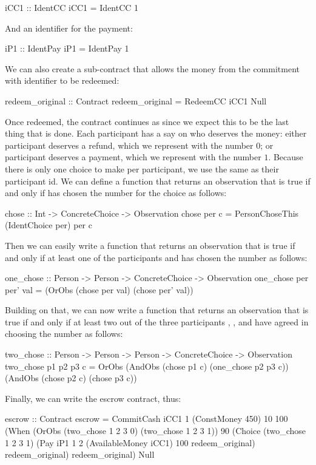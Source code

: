 \documentclass[runningheads]{llncs}
\begin{document}
\begin{haskellcode}
iCC1 :: IdentCC
iCC1 = IdentCC 1
\end{haskellcode}
And an identifier for the payment:
\begin{haskellcode}
iP1 :: IdentPay
iP1 = IdentPay 1
\end{haskellcode}
We can also create a sub-contract that allows the money from the commitment with identifier  to 
be redeemed:
\begin{haskellcode}
redeem_original :: Contract
redeem_original = RedeemCC iCC1 Null
\end{haskellcode}
Once redeemed, the contract continues as  since we expect this to be the last thing that is done.
Each participant has a say on who deserves the money: either participant  deserves a refund, which we 
represent with the number $0$; or participant  deserves a payment, which we represent with the number 
$1$. Because there is only one choice to make per participant, we use the same  as their 
participant id. We can define a function that returns an observation that is true if and only if
 has chosen the number  for the choice  as follows:
\begin{haskellcode}
chose :: Int -> ConcreteChoice -> Observation
chose per c = PersonChoseThis (IdentChoice per) per c
\end{haskellcode}
Then we can easily write a function that returns an observation that is true if and only if at least one of the 
participants  and  has chosen the number  as follows:
\begin{haskellcode}
one_chose :: Person -> Person -> ConcreteChoice -> Observation
one_chose per per' val = (OrObs (chose per val) (chose per' val)) 
\end{haskellcode}
Building on that, we can now write a function that returns an observation that is true if and only if at least 
two out of the three participants , , and  have agreed in 
choosing the number  as follows:
\begin{haskellcode}
two_chose :: Person -> Person -> Person -> ConcreteChoice -> Observation
two_chose p1 p2 p3 c = OrObs (AndObs (chose p1 c) (one_chose p2 p3 c))
                             (AndObs (chose p2 c) (chose p3 c))
\end{haskellcode}
Finally, we can write the escrow contract, thus:
\begin{haskellcode}
escrow :: Contract
escrow = CommitCash iCC1 1 (ConstMoney 450) 10 100
                    (When (OrObs (two_chose 1 2 3 0)
                                 (two_chose 1 2 3 1))
                          90
                          (Choice (two_chose 1 2 3 1)
                                  (Pay iP1 1 2 (AvailableMoney iCC1) 100
                                       redeem_original)
                                  redeem_original)
                          redeem_original)
                    Null
\end{haskellcode}
\end{document}
